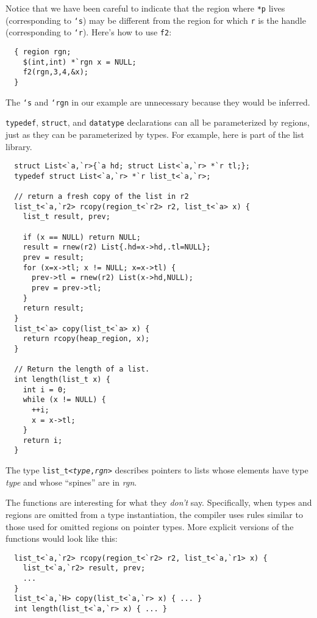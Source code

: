 Notice that we have been careful to indicate that the region where
\texttt{*p} lives (corresponding to \texttt{`s}) may be different from
the region for which \texttt{r} is the handle (corresponding to
\texttt{`r}).  Here's how to use \texttt{f2}:
\begin{verbatim}
  { region rgn;
    $(int,int) *`rgn x = NULL; 
    f2(rgn,3,4,&x);
  }
\end{verbatim} %
The \texttt{`s} and \texttt{`rgn} in our example are unnecessary
because they would be inferred.

\texttt{typedef}, \texttt{struct}, and \texttt{datatype}
declarations can all be parameterized by regions,
just as they can be parameterized by types.  For example, here is part
of the list library.
\begin{verbatim}
  struct List<`a,`r>{`a hd; struct List<`a,`r> *`r tl;};
  typedef struct List<`a,`r> *`r list_t<`a,`r>;

  // return a fresh copy of the list in r2
  list_t<`a,`r2> rcopy(region_t<`r2> r2, list_t<`a> x) {
    list_t result, prev;

    if (x == NULL) return NULL;
    result = rnew(r2) List{.hd=x->hd,.tl=NULL};
    prev = result;
    for (x=x->tl; x != NULL; x=x->tl) {
      prev->tl = rnew(r2) List(x->hd,NULL);
      prev = prev->tl;
    }
    return result;
  }  
  list_t<`a> copy(list_t<`a> x) {
    return rcopy(heap_region, x);
  }

  // Return the length of a list. 
  int length(list_t x) {
    int i = 0;
    while (x != NULL) {
      ++i;
      x = x->tl;
    }
    return i;
  }
\end{verbatim}
The type \texttt{list_t<\textit{type},\textit{rgn}>} describes
pointers to lists whose elements have type \textit{type} and whose
``spines'' are in \textit{rgn}.  

The functions are interesting for what they \emph{don't} say.
Specifically, when types and regions are omitted from a type
instantiation, the compiler uses rules similar to those used for
omitted regions on pointer types.  More explicit versions of the
functions would look like this:
\begin{verbatim}
  list_t<`a,`r2> rcopy(region_t<`r2> r2, list_t<`a,`r1> x) {
    list_t<`a,`r2> result, prev;
    ...
  }
  list_t<`a,`H> copy(list_t<`a,`r> x) { ... }
  int length(list_t<`a,`r> x) { ... }
\end{verbatim}



